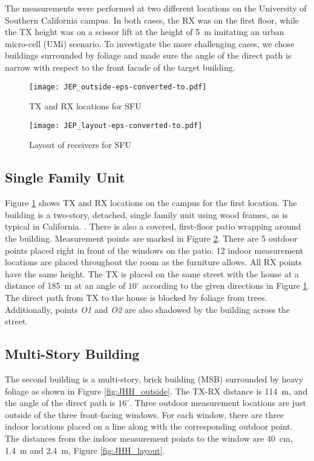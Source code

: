 \documentclass[conference]{IEEEtran}
\begin{document}
The measurements were performed at two different locations on the University of Southern California campus. In both cases, the RX was on the first floor, while the TX height was on a scissor lift at the height of \SI{5}{m} imitating an urban micro-cell (UMi) scenario. To investigate the more challenging cases, we chose buildings surrounded by foliage and made sure the angle of the direct path is narrow with respect to the front facade of the target building.  


\begin{figure}[tbp]
        \centering\texttt{[image: JEP\_outside-eps-converted-to.pdf]}\caption{TX and RX locations for SFU}\label{fig:JEP_outside}
\end{figure}


\begin{figure}[tbp]
        \centering\texttt{[image: JEP\_layout-eps-converted-to.pdf]}\caption{Layout of receivers for SFU}\label{fig:JEP_layout}
\end{figure}

\subsection{Single Family Unit}

Figure \ref{fig:JEP_outside} shows TX and RX locations on the campus for the first location. The building is a two-story, detached, single family unit using wood frames, as is typical in California. . There is also a covered, first-floor patio wrapping around the building. Measurement points are marked in Figure \ref{fig:JEP_layout}. There are 5 outdoor points placed right in front of the windows on the patio. 12 indoor measurement locations are placed throughout the room as the furniture allows. All RX points have the same height. The TX is placed on the same street with the house at a distance of \SI{185}{m} at an angle of $10^\circ$ according to the given directions in Figure \ref{fig:JEP_outside}. The direct path from TX to the house is blocked by foliage from trees. Additionally, points {\em O1} and {\em O2} are also shadowed by the building across the street.  



\subsection{Multi-Story Building}
The second building is a multi-story, brick building (MSB) surrounded by heavy foliage as shown in Figure \ref{fig:JHH_outside}. The TX-RX distance is \SI{114}{m}, and the angle of the direct path is $16^\circ$. Three outdoor measurement locations are just outside of the three front-facing windows. For each window, there are three indoor locations placed on a line along with the corresponding outdoor point. The distances from the indoor measurement points to the window are \SI{40}{cm}, \SI{1.4}{m} and \SI{2.4}{m}, Figure \ref{fig:JHH_layout}. 
\end{document}

